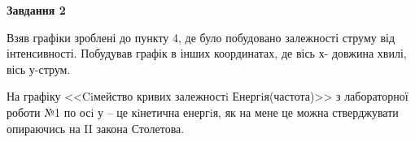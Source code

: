 \documentclass[a4paper,14pt]{extreport}
\begin{document}
	
	
	

\newpage
\begin{center}
\textbf{Завдання 2}
\end{center}
	
Взяв графіки зроблені до пункту 4, де було побудовано залежності струму від інтенсивності. Побудував графік в інших координатах, де вісь х- довжина хвилі, вісь у-струм. 
	\begin{center}
	\begin{figure}[h!]
		\label{ris2}
	\end{figure}
	\end{center}
	
	




	\begin{center}
	\begin{figure}[h!]
		\label{ris2}
	\end{figure}
	\end{center}


	На графіку <<Ciмейство кривих залежностi Енергiя(частота)>> з лабораторної роботи №1  по осi у -- це кiнетична енергiя, як на мене це можна стверджувати опираючись на II закона Столетова.
\end{document}
